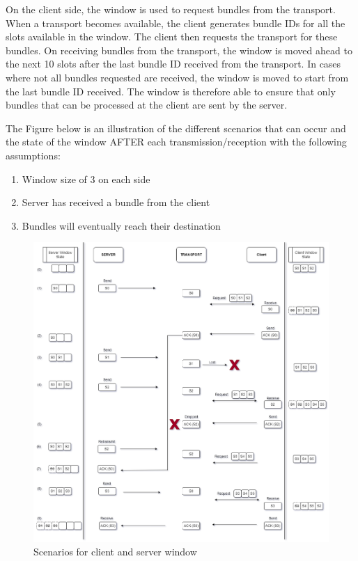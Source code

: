 On the client side, the window is used to request bundles from the transport. When a transport becomes available, the client generates bundle IDs for all the slots available in the window. The client then requests the transport for these bundles. On receiving bundles from the transport, the window is moved ahead to the next 10 slots after the last bundle ID received from the transport. In cases where not all bundles requested are received, the window is moved to start from the last bundle ID received.
The window is therefore able to ensure that only bundles that can be processed at the client are sent by the server.

The Figure below is an illustration of the different scenarios that can occur and the state of the window AFTER each transmission/reception with the following assumptions: 
\begin{enumerate}[label=(\arabic*)]
\item Window size of 3 on each side
\item Server has received a bundle from the client
\item Bundles will eventually reach their destination
\end{enumerate}

\begin{figure}[ht!]
\centering
\includegraphics[width= 150mm]{./images/Window_scenarios.drawio.png}
\caption{Scenarios for client and server window}
\end{figure}


